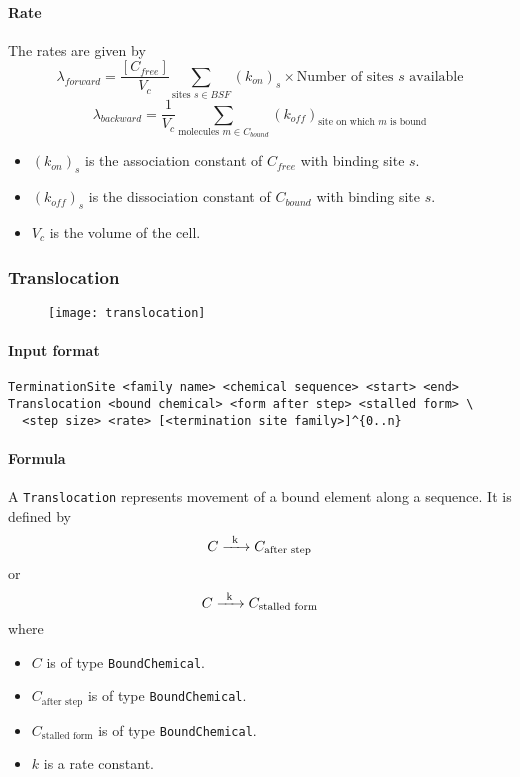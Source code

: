 \paragraph{Rate} The rates are given by
$$
	\lambda_{forward} = \frac{[C_{free}]}{V_c} \sum_{\text{sites }s \in BSF} (k_{on})_s \times \text{Number of sites $s$ available}
$$ 
$$
	\lambda_{backward} = \frac{1}{V_c} \sum_{\text{molecules }m \in C_{bound}} (k_{off})_\text{site on which $m$ is bound}
$$
\begin{itemize}
	\item $(k_{on})_s$ is the association constant of $C_{free}$ with binding site $s$.
	\item $(k_{off})_s$ is the dissociation constant of $C_{bound}$ with binding site $s$.
	\item $V_c$ is the volume of the cell.
\end{itemize}

\subsubsection{Translocation}

\begin{figure}[!ht]
	\centering
	\texttt{[image: translocation]}
\end{figure}

\paragraph{Input format}
\begin{verbatim}
TerminationSite <family name> <chemical sequence> <start> <end>
Translocation <bound chemical> <form after step> <stalled form> \
  <step size> <rate> [<termination site family>]^{0..n}
\end{verbatim}

\paragraph{Formula} A \texttt{Translocation} represents movement of a bound element along a sequence. It is defined by
$$
	\reactionIrr{C}{C_\text{after step}}{k}{}
$$
or
$$
	\reactionIrr{C}{C_\text{stalled form}}{k}{}
$$
where
\begin{itemize}
	\item $C$ is of type \texttt{BoundChemical}.
	\item $C_\text{after step}$ is of type \texttt{BoundChemical}.
	\item $C_\text{stalled form}$ is of type \texttt{BoundChemical}.
	\item $k$ is a rate constant.
\end{itemize}

